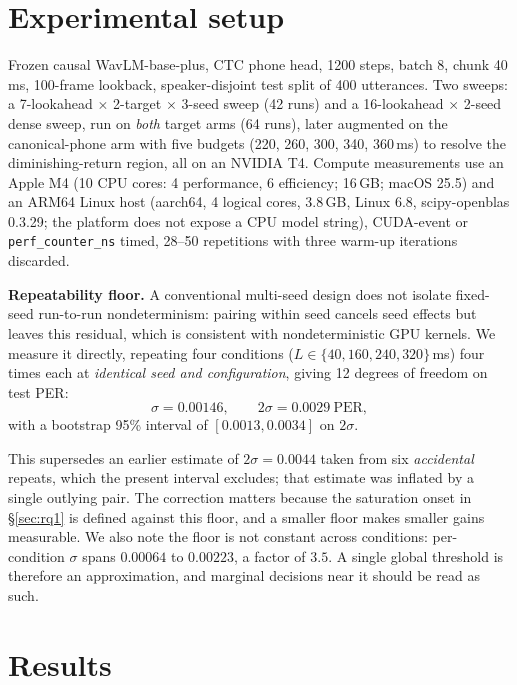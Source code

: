 \documentclass[journal]{IEEEtran}
\begin{document}
\section{Experimental setup}

Frozen causal WavLM-base-plus, CTC phone head, 1200 steps, batch 8, chunk
40\,ms, 100-frame lookback, speaker-disjoint test split of 400 utterances.
Two sweeps: a 7-lookahead $\times$ 2-target $\times$ 3-seed sweep (42 runs)
and a 16-lookahead $\times$ 2-seed dense sweep, run on \emph{both} target arms
(64 runs), later augmented on the canonical-phone arm with five budgets (220, 260,
300, 340, 360\,ms) to resolve the diminishing-return region, all on an NVIDIA
T4. Compute measurements use an Apple M4
(10 CPU cores: 4 performance, 6 efficiency; 16\,GB; macOS 25.5) and an
ARM64 Linux host (aarch64, 4 logical cores, 3.8\,GB, Linux 6.8,
scipy-openblas 0.3.29; the platform does not expose a CPU model string), CUDA-event or \texttt{perf\_counter\_ns} timed, 28--50 repetitions
with three warm-up iterations discarded.

\noindent\textbf{Repeatability floor.} A conventional multi-seed design does
not isolate fixed-seed run-to-run nondeterminism: pairing within seed cancels
seed effects but leaves this residual, which is consistent with nondeterministic GPU
kernels. We measure it directly, repeating four conditions
($L\in\{40,160,240,320\}$\,ms) four times each at \emph{identical seed and
configuration}, giving 12 degrees of freedom on test PER:
\begin{equation}
\sigma = 0.00146, \qquad 2\sigma = \mathbf{0.0029}\ \text{PER},
\label{eq:floor}
\end{equation}
with a bootstrap 95\% interval of $[0.0013, 0.0034]$ on $2\sigma$.

This supersedes an earlier estimate of $2\sigma=0.0044$ taken from six
\emph{accidental} repeats, which the present interval excludes; that estimate
was inflated by a single outlying pair. The correction matters because the
saturation onset in \S\ref{sec:rq1} is defined against this floor, and a
smaller floor makes smaller gains measurable. We also note the floor is not
constant across conditions: per-condition $\sigma$ spans $0.00064$ to
$0.00223$, a factor of $3.5$. A single global threshold is therefore an
approximation, and marginal decisions near it should be read as such.

\section{Results}
\end{document}

